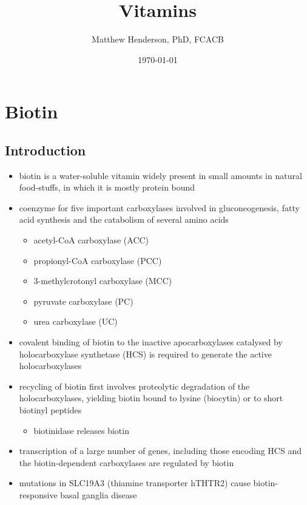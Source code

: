\documentclass[12pt]{scrartcl}
\author{Matthew Henderson, PhD, FCACB}
\date{\today}
\title{Vitamins}
\begin{document}
\maketitle
\setcounter{tocdepth}{2}
\tableofcontents



\section{Biotin}
\label{sec:org577a661}
\subsection{Introduction}
\label{sec:org615e450}
\begin{itemize}
\item biotin is a water-soluble vitamin widely present in small amounts in
natural food-stuffs, in which it is mostly protein bound
\item coenzyme for five important carboxylases involved in
gluconeogenesis, fatty acid synthesis and the catabolism of several
amino acids
\begin{itemize}
\item acetyl-CoA carboxylase (ACC)
\end{itemize}
\begin{itemize}
\item propionyl-CoA carboxylase (PCC)
\end{itemize}
\begin{itemize}
\item 3-methylcrotonyl carboxylase (MCC)
\end{itemize}
\begin{itemize}
\item pyruvate carboxylase (PC)
\end{itemize}
\begin{itemize}
\item urea carboxylase (UC)
\end{itemize}

\item covalent binding of biotin to the inactive apocarboxylases
catalysed by holocarboxylase synthetase (HCS) is required to
generate the active holocarboxylases
\item recycling of biotin first involves proteolytic degradation of the
holocarboxylases, yielding biotin bound to lysine (biocytin) or to
short biotinyl peptides
\begin{itemize}
\item biotinidase releases biotin
\end{itemize}
\item transcription of a large number of genes, including those encoding
HCS and the biotin-dependent carboxylases are regulated by biotin
\item mutations in SLC19A3 (thiamine transporter hTHTR2) cause
biotin-responsive basal ganglia disease
\end{itemize}
\end{document}

